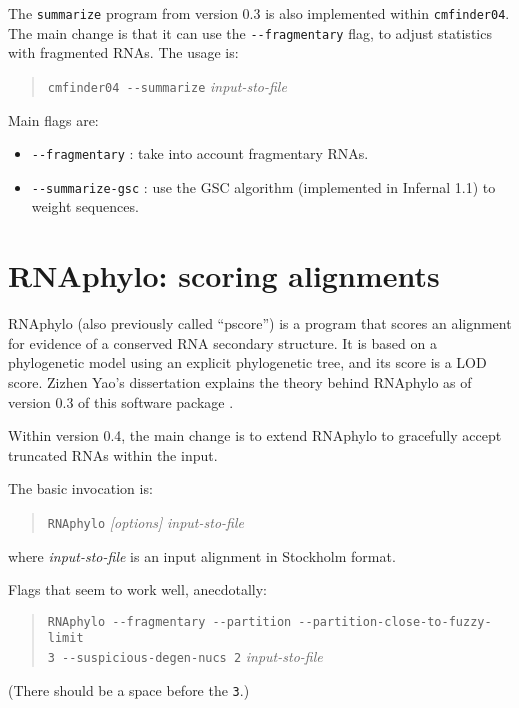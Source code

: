 \documentclass[letterpaper,12pt]{report}
\begin{document}
The {\tt summarize} program from version 0.3 is also implemented within {\tt cmfinder04}.  The main change is that it can use the {\tt -{}-fragmentary} flag, to adjust statistics with fragmented RNAs.  The usage is:
\begin{quote}
{\tt cmfinder04 -{}-summarize} {\it input-sto-file}
\end{quote}

Main flags are:
\begin{itemize}
\item {\tt -{}-fragmentary} : take into account fragmentary RNAs.
\item {\tt -{}-summarize-gsc} : use the GSC algorithm (implemented in Infernal 1.1) to weight sequences.
\end{itemize}

\chapter{RNAphylo: scoring alignments}

RNAphylo (also previously called ``pscore'') is a program that scores an alignment for evidence of a conserved RNA secondary structure.  It is based on a phylogenetic model using an explicit phylogenetic tree, and its score is a LOD score.  Zizhen Yao's dissertation explains the theory behind RNAphylo as of version 0.3 of this software package \cite{ZizhenThesis}.

Within version 0.4, the main change is to extend RNAphylo to gracefully accept truncated RNAs within the input.

The basic invocation is:
\begin{quote}
{\tt RNAphylo} {\it [options]} {\it input-sto-file}
\end{quote}
where {\it input-sto-file} is an input alignment in Stockholm format.

Flags that seem to work well, anecdotally:
\begin{quote}
{\tt RNAphylo -{}-fragmentary -{}-partition -{}-partition-close-to-fuzzy-limit\\3 -{}-suspicious-degen-nucs 2} {\it input-sto-file}
\end{quote}
(There should be a space before the {\tt 3}.)
\end{document}
